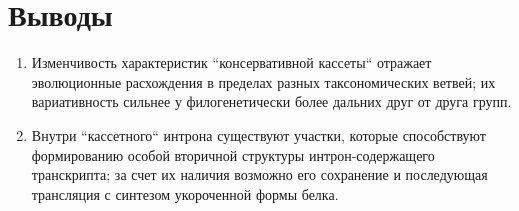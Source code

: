 \clearpage
\section{Выводы}

\begin{enumerate}[left=\parindent]
    \item Изменчивость характеристик ``консервативной кассеты`` отражает эволюционные расхождения в пределах разных таксономических ветвей; их вариативность сильнее у филогенетически более дальних друг от друга групп.
    \item Внутри ``кассетного`` интрона существуют участки, которые способствуют формированию особой вторичной структуры интрон-содержащего транскрипта; за счет их наличия возможно его сохранение и последующая трансляция с синтезом укороченной формы белка.
\end{enumerate}
